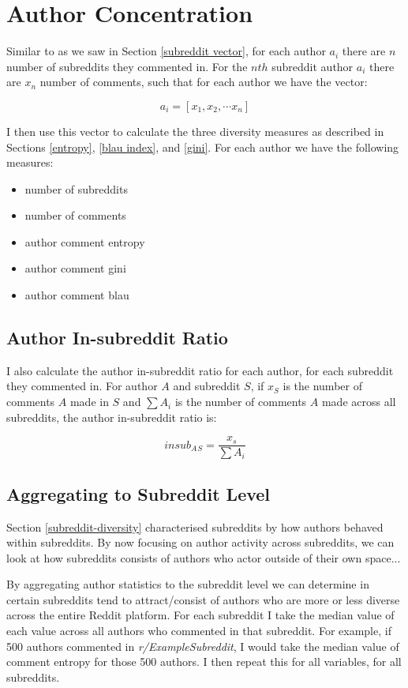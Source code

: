\section{Author Concentration} \label{author-concetration}

Similar to as we saw in Section \ref{subreddit vector}, for each author $a_i$ there are $n$ number of subreddits they commented in. For the $nth$ subreddit author $a_i$ there are $x_n$ number of comments, such that for each author we have the vector:

$$a_i = [x_1, x_2, \cdots x_n]$$

I then use this vector to calculate the three diversity measures as described in Sections \ref{entropy}, \ref{blau index}, and \ref{gini}. For each author we have the following measures:

\begin{itemize}
    \item number of subreddits
    \item number of comments
    \item author comment entropy
    \item author comment gini
    \item author comment blau
\end{itemize}


\subsection{Author In-subreddit Ratio}
I also calculate the author in-subreddit ratio for each author, for each subreddit they commented in.
For author $A$ and subreddit $S$, if $x_S$ is the number of comments $A$ made in $S$ and $\sum A_i$ is the number of comments $A$ made across all subreddits, the author in-subreddit ratio is:

$$insub_A{}_S = \frac{x_s}{\sum A_i}$$

\subsection{Aggregating to Subreddit Level}
Section \ref{subreddit-diversity} characterised subreddits by how authors behaved within subreddits. By now focusing on author activity across subreddits, we can look at how subreddits consists of authors who actor outside of their own space...

By aggregating author statistics to the subreddit level we can determine in certain subreddits tend to attract/consist of authors who are more or less diverse across the entire Reddit platform. For each subreddit I take the median value of each value across all authors who commented in that subreddit. For example, if 500 authors commented in \textit{r/ExampleSubreddit}, I would take the median value of comment entropy for those 500 authors. I then repeat this for all variables, for all subreddits.

